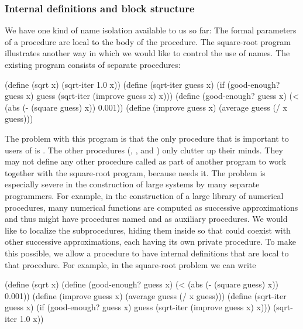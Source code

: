 \subsubsection*{Internal definitions and block structure}

We have one kind of name isolation available to us so far: The formal
parameters of a procedure are local to the body of the procedure.  The
square-root program illustrates another way in which we would like to control
the use of names.  The existing program consists of separate procedures:

\begin{codeBlock}
(define (sqrt x)
  (sqrt-iter 1.0 x))
(define (sqrt-iter guess x)
  (if (good-enough? guess x)
      guess
      (sqrt-iter (improve guess x) x)))
(define (good-enough? guess x)
  (< (abs (- (square guess) x)) 0.001))
(define (improve guess x)
  (average guess (/ x guess)))
\end{codeBlock}

\noindent
The problem with this program is that the only procedure that is important to
users of  is .  The other procedures (,
, and ) only clutter up their minds.  They may
not define any other procedure called  as part of another
program to work together with the square-root program, because 
needs it.  The problem is especially severe in the construction of large
systems by many separate programmers.  For example, in the construction of a
large library of numerical procedures, many numerical functions are computed as
successive approximations and thus might have procedures named
 and  as auxiliary procedures.  We would like
to localize the subprocedures, hiding them inside  so that
 could coexist with other successive approximations, each having its
own private  procedure.  To make this possible, we allow a
procedure to have internal definitions that are local to that procedure.  For
example, in the square-root problem we can write

\begin{codeBlock}
(define (sqrt x)
  (define (good-enough? guess x)
    (< (abs (- (square guess) x)) 0.001))
  (define (improve guess x) (average guess
                                     (/ x guess)))
  (define (sqrt-iter guess x)
    (if (good-enough? guess x)
        guess
        (sqrt-iter (improve guess x) x)))
  (sqrt-iter 1.0 x))
\end{codeBlock}

